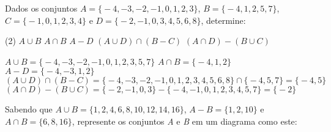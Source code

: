 \documentclass[a4paper,11pt,addpoints]{exam}
\begin{document}
\begin{questions}
\question[2] 
  Dados os conjuntos $A = \big\{-4,-3,-2,-1,0,1,2,3\big\}$, $B = \big\{-4,1,2,5,7\big\}$, $C = \big\{-1,0,1,2,3,4\big\}$ e $D = \big\{-2,-1,0,3,4,5,6,8\big\}$, determine:
  \begin{tasks}(2)
    \task $A \cup B$
    \task $A \cap B$
    \task $A - D$
    \task $(A \cup D) \cap (B - C)$
    \task $(A \cap D) - (B \cup C)$
  \end{tasks}

\begin{solution}[1in]
  \begin{tasks}
    \task $A \cup B = \big\{-4,-3,-2,-1,0,1,2,3,5,7\big\}$
    \task $A \cap B = \big\{-4,1,2\big\}$
    \task $A - D = \big\{-4,-3,1,2\big\}$
    \task $(A \cup D) \cap (B - C) = \big\{-4,-3,-2,-1,0,1,2,3,4,5,6,8\big\} \cap \big\{-4,5,7\big\} = \big\{-4,5\big\}$
    \task $(A \cap D) - (B \cup C) = \big\{-2,-1,0,3\big\} - \big\{-4,-1,0,1,2,3,4,5,7\big\} = \big\{-2\big\}$
  \end{tasks}
\end{solution}

\question[1]
  Sabendo que $A \cup B = \big\{1,2,4,6,8,10,12,14,16\big\}$, $A - B = \big\{1,2,10\big\}$ e $A \cap B = \big\{6, 8, 16\big\}$, represente os conjuntos \textit{A} e \textit{B} em um diagrama como este:

  \begin{center}
  \end{center}

\begin{solution}
  \begin{center}
\end{center}
\end{solution}
\end{questions}
\end{document}
